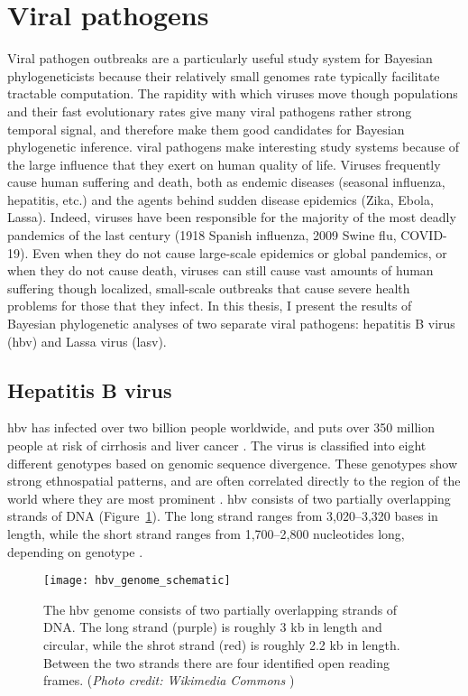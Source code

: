 \section{Viral pathogens}
Viral pathogen outbreaks are a particularly useful study system for Bayesian phylogeneticists because their relatively small genomes rate typically facilitate tractable computation.
The rapidity with which viruses move though populations and their fast evolutionary rates give many viral pathogens rather strong temporal signal, and therefore make them good candidates for Bayesian phylogenetic inference.
viral pathogens make interesting study systems because of the large influence that they exert on human quality of life.
Viruses frequently cause human suffering and death, both as endemic diseases (seasonal influenza, hepatitis, etc.) and the agents behind sudden disease epidemics (Zika, Ebola, Lassa).
Indeed, viruses have been responsible for the majority of the most deadly pandemics of the last century (1918 Spanish influenza, 2009 Swine flu, COVID-19).
Even when they do not cause large-scale epidemics or global pandemics, or when they do not cause death, viruses can still cause vast amounts of human suffering though localized, small-scale outbreaks that cause severe health problems for those that they infect.
In this thesis, I present the results of Bayesian phylogenetic analyses of two separate viral pathogens: hepatitis B virus (\gls{hbv}) and Lassa virus (\gls{lasv}).


\subsection{Hepatitis B virus}

\gls{hbv} has infected over two billion people worldwide, and puts over 350 million people at risk of cirrhosis and liver cancer \cite{kane1995global}.
The virus is classified into eight different genotypes based on genomic sequence divergence.
These genotypes show strong ethnospatial patterns, and are often correlated directly to the region of the world where they are most prominent \cite{schaefer2007hepatitis}.
\gls{hbv} consists of two partially overlapping strands of DNA (Figure~\ref{fig:hbvGenome}).
The long strand ranges from 3,020--3,320 bases in length, while the short strand ranges from 1,700--2,800 nucleotides long, depending on genotype \cite{kay2007hepatitis}.

\begin{figure}[ht]
  \centering
  \medskip
  \texttt{[image: hbv\_genome\_schematic]}
  \caption[Scematic of the HBV genome]{The \gls{hbv} genome consists of two partially overlapping strands of DNA. The long strand (purple) is roughly 3 kb in length and circular, while the shrot strand (red) is roughly 2.2 kb in length. Between the two strands there are four identified open reading frames. (\textit{Photo credit: Wikimedia Commons} \cite{HBVwiki})}
  \label{fig:hbvGenome}
\end{figure}

